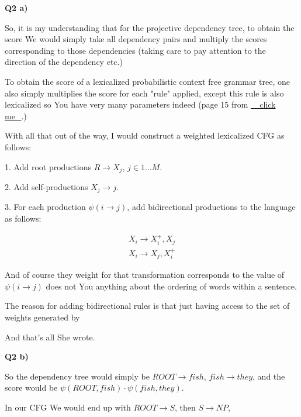 \documentclass{article}
\begin{document}
	
	
\textbf{Q2 a)}

	So, it is my understanding that for the projective dependency tree, to obtain the score We would simply take all dependency pairs and multiply the scores corresponding to those dependencies (taking care to pay attention to the direction of the dependency etc.)
	
	To obtain the score of a lexicalized probabilistic context free grammar tree, one also simply multiplies the score for each "rule" applied, except this rule is also lexicalized so You have very many parameters indeed (page 15 from \href{http://www.cs.columbia.edu/~mcollins/courses/nlp2011/notes/lexpcfgs.pdf}{\_ click me\_}.)
	
	With all that out of the way, I would construct a weighted lexicalized CFG as follows: 
	
	1. Add root productions $R \to X_j$, $j\in 1\ldots M$.
	
	2. Add self-productions $X_j \to j$.
	
	3. For each production $\psi(i\to j)$, add bidirectional productions to the language as follows:
	
	\begin{align}
		X_i \to X_i^+, X_j\\
		X_i \to X_j, X_i^+
	\end{align}
	
	And of course they weight for that transformation corresponds to the value of $\psi(i\to j)$ does not You anything about the ordering of words within a sentence.
	
	The reason for adding bidirectional rules is that just having access to the set of weights generated by 
	
	And that's all She wrote.
	
\textbf{Q2 b)}

	So the dependency tree would simply be $ROOT\to fish$, $fish\to they$, and the score would be $\psi(ROOT, fish)\cdot \psi(fish, they)$.
	
	In our CFG We would end up with $ROOT\to S$, then $S\to NP$, 
	
\end{document}
